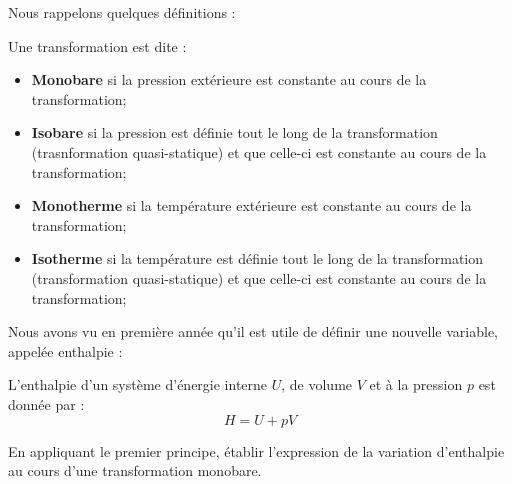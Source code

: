 \documentclass[11pt,fleqn]{book} %
\newcommand{\dd}{\mathrm{d}}
\begin{document}
Nous rappelons quelques définitions :
\begin{definition}
    Une transformation est dite :
    \begin{itemize}
        \item \textbf{Monobare} si la pression extérieure est constante au cours de la transformation;
        \item \textbf{Isobare} si la pression est définie tout le long de la transformation (trasnformation quasi-statique) et que celle-ci est constante au cours de la transformation;
        \item \textbf{Monotherme} si la température extérieure est constante au cours de la transformation;
        \item \textbf{Isotherme} si la température est définie tout le long de la transformation (transformation quasi-statique) et que celle-ci est constante au cours de la transformation;
    \end{itemize}
\end{definition}

Nous avons vu en première année qu'il est utile de définir une nouvelle variable, appelée enthalpie :
\begin{definition}
    L'enthalpie d'un système d'énergie interne $U$, de volume $V$ et à la pression $p$ est donnée par :
    \begin{equation}
        H = U + p V
    \end{equation}
\end{definition}

\begin{capex}
En appliquant le premier principe, établir l'expression de la variation d'enthalpie au cours d'une transformation monobare.
\end{capex}

%
\end{document}
